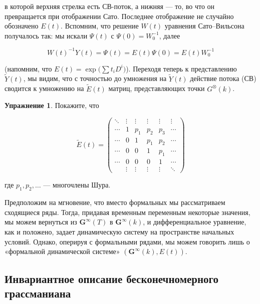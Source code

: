 \documentclass{article}
\theoremstyle{definition}
\theoremstyle{definition} %
\theoremstyle{remark}     %
\theoremstyle{definition}
\theoremstyle{definition}
\theoremstyle{definition}
\theoremstyle{definition}
\theoremstyle{definition}
\theoremstyle{definition}
\theoremstyle{definition}
\theoremstyle{definition}
\newtheorem{exercise}{Упражнение}[section]
\begin{document}
в которой верхняя стрелка есть СВ-поток, а нижняя --- то, во что он превращается при отображении Сато. Последнее отображение не случайно обозначено \( E(t) \). Вспомним, что решение \( W(t) \) уравнения Сато--Вильсона получалось так: мы искали \( \Psi(t) \) с \( \Psi(0) = W_0^{-1} \), далее

\[
W(t)^{-1} Y(t) = \Psi(t) = E(t) \Psi(0) = E(t) W_0^{-1}
\]

(напомним, что \( E(t) = \exp\bigl(\sum t_i D^i\bigr) \)). Переходя теперь к представлению \( \tilde{Y}(t) \), мы видим, что с точностью до умножения на \( \tilde{Y}(t) \) действие потока (СВ) сводится к умножению на \( \tilde{E}(t) \) матриц, представляющих точки \( G^\otimes(k) \).





\begin{exercise}
  Покажите, что
  


\[
\tilde{E}(t) = 
\begin{pmatrix}
\ddots & \vdots & \vdots & \vdots & \vdots & \vdots \\
\cdots & 1 & p_1 & p_2 & p_3 & \cdots \\
\cdots & 0 & 1 & p_1 & p_2 & \cdots \\
\cdots & 0 & 0 & 1 & p_1 & \cdots \\
\cdots & 0 & 0 & 0 & 1 & \cdots \\
& \vdots & \vdots & \vdots & \vdots & \ddots
\end{pmatrix}
\]


  где \(p_1, p_2, \ldots\) — многочлены Шура.
\end{exercise}

Предположим на мгновение, что вместо формальных мы рассматриваем сходящиеся ряды. Тогда, придавая временным переменным некоторые значения, мы можем вернуться из \(\mathbf{G}^\infty(T)\) в \(\mathbf{G}^\infty(k)\), и дифференциальное уравнение, как и положено, задает динамическую систему на пространстве начальных условий. Однако, оперируя с формальными рядами, мы можем говорить лишь о «формальной динамической системе» \((\mathbf{G}^\infty(k), E(t))\).



\subsection{Инвариантное описание бесконечномерного грассманиана}
\end{document}
